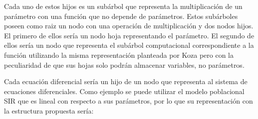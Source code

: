 Cada uno de estos hijos es un subárbol que representa la multiplicación de un parámetro con una función que no depende de parámetros. Estos subárboles poseen como raiz un nodo con una operación de multiplicación y dos nodos hijos. El primero de ellos sería un nodo hoja representando el parámetro. El segundo de ellos sería un nodo que representa el subárbol computacional correspondiente a la función utilizando la misma representación planteada por Koza \cite{zelinka2005analytic} pero con la peculiaridad de que sus hojas solo podrán almacenar variables, no parámetros.

\begin{center}
\end{center}


Cada ecuación diferencial sería un hijo de un nodo que representa al sistema de ecuaciones diferenciales. Como ejemplo se puede utilizar el modelo poblacional SIR que es lineal con respecto a sus parámetros, por lo que su representación con la estructura propuesta sería:

